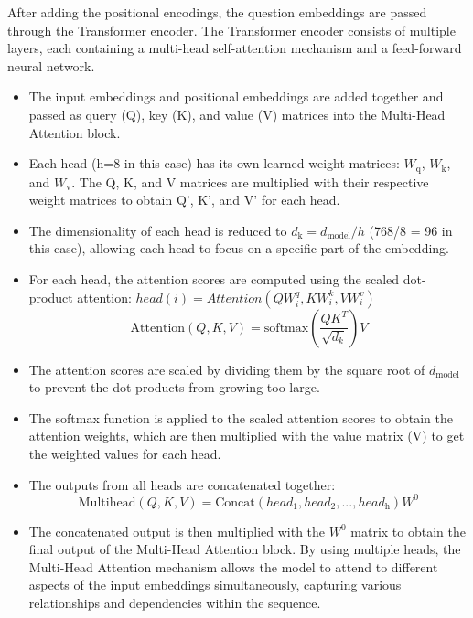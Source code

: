 \documentclass[pdflatex,sn-mathphys-num]{sn-jnl}%
\begin{document}
After adding the positional encodings, the question embeddings are passed through the Transformer encoder. The Transformer encoder consists of multiple layers, each containing a multi-head self-attention mechanism and a feed-forward neural network.
\begin{itemize}
    \item The input embeddings and positional embeddings are added together and passed as query (Q), key (K), and value (V) matrices into the Multi-Head Attention block.
    \item Each head (h=8 in this case) has its own learned weight matrices: $W_{\mathrm{q}}$, $W_{\mathrm{k}}$, and $W_{\mathrm{v}}$. The Q, K, and V matrices are multiplied with their respective weight matrices to obtain Q', K', and V' for each head.
    \item The dimensionality of each head is reduced to $d_{\mathrm{k}} = d_{\mathrm{model}} / h$ (768/8 = 96 in this case), allowing each head to focus on a specific part of the embedding.
    \item For each head, the attention scores are computed using the scaled dot-product attention:
    $head(i) = Attention(QW_i^q, KW_i^k, VW_i^v)$
    \begin{equation}
    \mathrm{Attention}\left(Q,K,V\right)=\mathrm{softmax}\left(\frac{QK^T}{\sqrt{d_k}}\right)V
    \end{equation}
    \item The attention scores are scaled by dividing them by the square root of $d_{\mathrm{model}}$ to prevent the dot products from growing too large.
    \item The softmax function is applied to the scaled attention scores to obtain the attention weights, which are then multiplied with the value matrix (V) to get the weighted values for each head.
    \item The outputs from all heads are concatenated together:
    \begin{equation}
        \mathrm{Multihead}\left(Q,K,V\right)=\mathrm{Concat}(head_{\mathrm{1}},head_{\mathrm{2}},\text{...}, head_{\mathrm{h}})W^0
    \end{equation}

    \item The concatenated output is then multiplied with the $W^0$ matrix to obtain the final output of the Multi-Head Attention block. By using multiple heads, the Multi-Head Attention mechanism allows the model to attend to different aspects of the input embeddings simultaneously, capturing various relationships and dependencies within the sequence.
\end{itemize}
\end{document}
